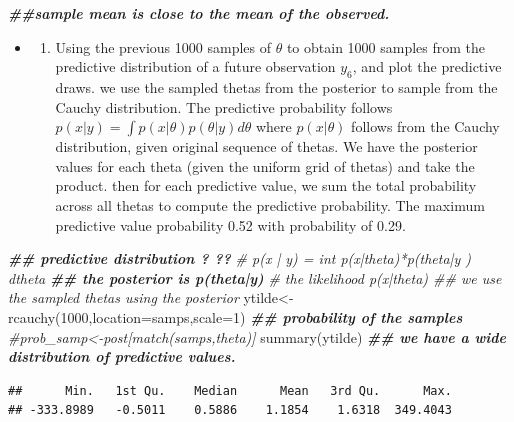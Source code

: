 \documentclass[
]{book}
\newenvironment{Shaded}{\begin{snugshade}}{\end{snugshade}}
\newcommand{\AttributeTok}[1]{\textcolor[rgb]{0.77,0.63,0.00}{#1}}
\newcommand{\CommentTok}[1]{\textcolor[rgb]{0.56,0.35,0.01}{\textit{#1}}}
\newcommand{\DecValTok}[1]{\textcolor[rgb]{0.00,0.00,0.81}{#1}}
\newcommand{\DocumentationTok}[1]{\textcolor[rgb]{0.56,0.35,0.01}{\textbf{\textit{#1}}}}
\newcommand{\FunctionTok}[1]{\textcolor[rgb]{0.00,0.00,0.00}{#1}}
\newcommand{\NormalTok}[1]{#1}
\newcommand{\OtherTok}[1]{\textcolor[rgb]{0.56,0.35,0.01}{#1}}
\providecommand{\tightlist}{%
  \setlength{\itemsep}{0pt}\setlength{\parskip}{0pt}}
\theoremstyle{definition}
\theoremstyle{definition}
\theoremstyle{definition}
\theoremstyle{definition}
\theoremstyle{remark}
\begin{document}
\begin{Shaded}
\begin{Highlighting}[]
  \DocumentationTok{\#\#sample mean is close to the mean of the observed.}
\end{Highlighting}
\end{Shaded}

\begin{itemize}
\item
  \begin{enumerate}
  \def\labelenumi{(\alph{enumi})}
  \setcounter{enumi}{2}
  \tightlist
  \item
    Using the previous 1000 samples of \(\theta\) to obtain 1000 samples from the predictive distribution of a future observation \(y_6\), and plot the predictive draws.
    we use the sampled thetas from the posterior to sample from the Cauchy distribution. The predictive probability follows \(p(x|y) =\int p(x|\theta)p(\theta|y)d\theta\) where \(p(x|\theta)\) follows from the Cauchy distribution, given original sequence of thetas. We have the posterior values for each theta (given the uniform grid of thetas) and take the product. then for each predictive value, we sum the total probability across all thetas to compute the predictive probability. The maximum predictive value probability 0.52 with probability of 0.29.
  \end{enumerate}
\end{itemize}

\begin{Shaded}
\begin{Highlighting}[]
\DocumentationTok{\#\# predictive distribution ? ?? }
 \CommentTok{\# p(x | y) = int p(x|theta)*p(theta|y ) dtheta}
\DocumentationTok{\#\# the posterior is p(theta|y) }
 \CommentTok{\# the likelihood p(x|theta)  \#\# we use the sampled thetas using the posterior}
\NormalTok{ ytilde}\OtherTok{\textless{}{-}}\FunctionTok{rcauchy}\NormalTok{(}\DecValTok{1000}\NormalTok{,}\AttributeTok{location=}\NormalTok{samps,}\AttributeTok{scale=}\DecValTok{1}\NormalTok{) }
 \DocumentationTok{\#\# probability of the samples }
 \CommentTok{\#prob\_samp\textless{}{-}post[match(samps,theta)]}
  \FunctionTok{summary}\NormalTok{(ytilde) }\DocumentationTok{\#\# we have a wide distribution of predictive values.}
\end{Highlighting}
\end{Shaded}

\begin{verbatim}
##      Min.   1st Qu.    Median      Mean   3rd Qu.      Max. 
## -333.8989   -0.5011    0.5886    1.1854    1.6318  349.4043
\end{verbatim}
\end{document}

